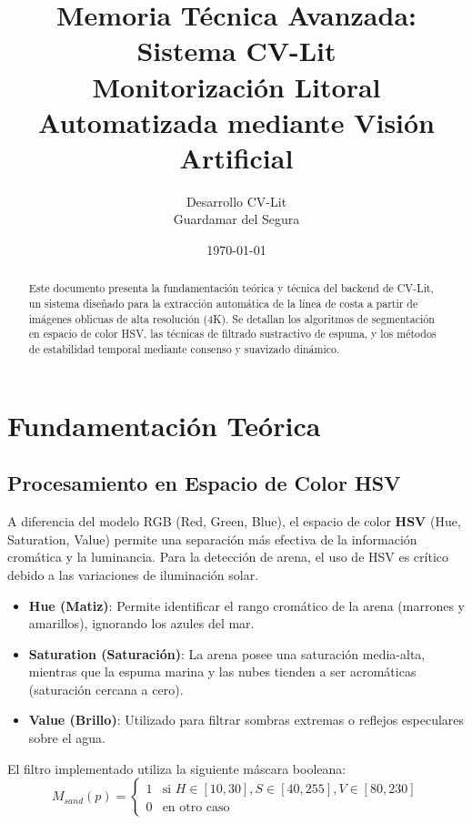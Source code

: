 \documentclass[12pt,a4paper]{article}
\title{\textbf{Memoria Técnica Avanzada: Sistema CV-Lit} \\ \large Monitorización Litoral Automatizada mediante Visión Artificial}
\author{Desarrollo CV-Lit \\ \small Guardamar del Segura}
\date{\today}
\begin{document}
\maketitle

\begin{abstract}
Este documento presenta la fundamentación teórica y técnica del backend de CV-Lit, un sistema diseñado para la extracción automática de la línea de costa a partir de imágenes oblicuas de alta resolución (4K). Se detallan los algoritmos de segmentación en espacio de color HSV, las técnicas de filtrado sustractivo de espuma, y los métodos de estabilidad temporal mediante consenso y suavizado dinámico.
\end{abstract}

\tableofcontents
\newpage

\section{Fundamentación Teórica}

\subsection{Procesamiento en Espacio de Color HSV}
A diferencia del modelo RGB (Red, Green, Blue), el espacio de color \textbf{HSV} (Hue, Saturation, Value) permite una separación más efectiva de la información cromática y la luminancia. Para la detección de arena, el uso de HSV es crítico debido a las variaciones de iluminación solar.

\begin{itemize}
    \item \textbf{Hue (Matiz)}: Permite identificar el rango cromático de la arena (marrones y amarillos), ignorando los azules del mar.
    \item \textbf{Saturation (Saturación)}: La arena posee una saturación media-alta, mientras que la espuma marina y las nubes tienden a ser acromáticas (saturación cercana a cero).
    \item \textbf{Value (Brillo)}: Utilizado para filtrar sombras extremas o reflejos especulares sobre el agua.
\end{itemize}

El filtro implementado utiliza la siguiente máscara booleana:
\begin{equation}
    M_{sand}(p) = 
    \begin{cases} 
      1 & \text{si } H \in [10, 30], S \in [40, 255], V \in [80, 230] \\
      0 & \text{en otro caso}
    \end{cases}
\end{equation}
\end{document}
